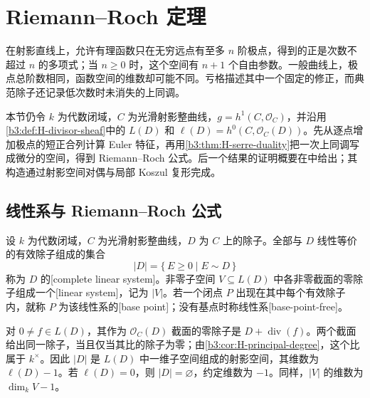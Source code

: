 
\section{Riemann–Roch 定理}
\label{b3:sec:H02}

在射影直线上，允许有理函数只在无穷远点有至多 \(n\) 阶极点，得到的正是次数不超过 \(n\) 的多项式；当 \(n\ge0\) 时，这个空间有 \(n+1\) 个自由参数。一般曲线上，极点总阶数相同，函数空间的维数却可能不同。亏格描述其中一个固定的修正，而典范除子还记录低次数时未消失的上同调。

\ProseParagraphBreak
本节仍令 \(k\) 为代数闭域，\(C\) 为光滑射影整曲线，\(g=h^1(C,\mathcal O_C)\)，并沿用\cref{b3:def:H-divisor-sheaf}中的 \(L(D)\) 和 \(\ell(D)=h^0(C,\mathcal O_C(D))\)。先从逐点增加极点的短正合列计算 Euler 特征，再用\cref{b3:thm:H-serre-duality}把一次上同调写成微分的空间，得到 Riemann–Roch 公式。后一个结果的证明概要在中给出；其构造通过射影空间对偶与局部 Koszul 复形完成。

\subsection{线性系与 Riemann–Roch 公式}
\label{b3:subsec:H02:01}

\begin{definition}\label{b3:def:H-linear-system}
	设 \(k\) 为代数闭域，\(C\) 为光滑射影整曲线，\(D\) 为 \(C\) 上的除子。全部与 \(D\) 线性等价的有效除子组成的集合
	\[
		|D|=\{\,E\ge0\mid E\sim D\,\}
	\]
	称为 \(D\) 的[complete linear system]。非零子空间 \(V\subseteq L(D)\) 中各非零截面的零除子组成一个[linear system]，记为 \(|V|\)。若一个闭点 \(P\) 出现在其中每个有效除子内，就称 \(P\) 为该线性系的[base point]；没有基点时称线性系[base-point-free]。
\end{definition}

对 \(0\ne f\in L(D)\)，其作为 \(\mathcal O_C(D)\) 截面的零除子是 \(D+\operatorname{div}(f)\)。两个截面给出同一除子，当且仅当其比的除子为零；由\cref{b3:cor:H-principal-degree}，这个比属于 \(k^\times\)。因此 \(|D|\) 是 \(L(D)\) 中一维子空间组成的射影空间，其维数为 \(\ell(D)-1\)。若 \(\ell(D)=0\)，则 \(|D|=\varnothing\)，约定维数为 \(-1\)。同样，\(|V|\) 的维数为 \(\dim_kV-1\)。

